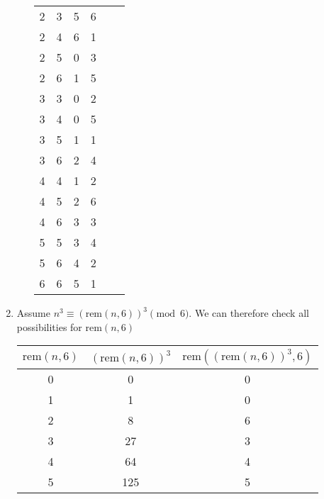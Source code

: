 \documentclass{article}
\newcommand{\rem}[2]{\textrm{rem}(#1, #2)}
\begin{document}
\begin{enumerate}
\begin{enumerate}
\begin{table}[H]
\begin{tabular}{|c|c|c|c|c|c|}
                            2 & 3 & 5   & 6   &    &     \\
                            2 & 4 & 6   & 1   &    &     \\
                            2 & 5 & 0   & 3   &    &     \\
                            2 & 6 & 1   & 5   &    &     \\
                            3 & 3 & 0   & 2   &    &     \\
                            3 & 4 & 0   & 5   &    &     \\
                            3 & 5 & 1   & 1   &    &     \\
                            3 & 6 & 2   & 4   &    &     \\
                            4 & 4 & 1   & 2   &    &     \\
                            4 & 5 & 2   & 6   &    &     \\
                            4 & 6 & 3   & 3   &    &     \\
                            5 & 5 & 3   & 4   &    &     \\
                            5 & 6 & 4   & 2   &    &     \\
                            6 & 6 & 5   & 1   &    &     \\
                            \hline
                            \end{tabular}
                            \end{table}    
            \end{enumerate}
        \item Assume $n^3 \equiv (\rem{n}{6})^3 \pmod{6}$. We can therefore check all possibilities for $\rem{n}{6}$
            \begin{table}[H]
                \centering
                \begin{tabular}{|c|c|c|}
                \hline
                $\rem{n}{6}$ & $(\rem{n}{6})^3$  & $\rem{(\rem{n}{6})^3}{6}$ \\
                \hline
                0 & 0   & 0 \\
                1 & 1   & 0 \\
                2 & 8   & 6 \\
                3 & 27  & 3 \\
                4 & 64  & 4 \\
                5 & 125 & 5 \\
                \hline

\end{tabular}
\end{table}
\end{enumerate}
\end{document}
